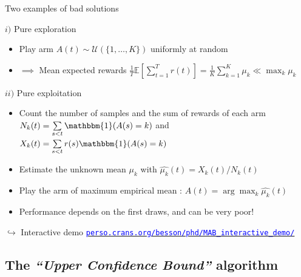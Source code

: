 \documentclass[11pt,english,ignorenonframetext,]{beamer}
\begin{document}
\begin{frame}{Two examples of bad solutions}

  \begin{exampleblock}{$i)$ Pure exploration}
    \begin{itemize}
      \item
      Play arm $A(t) \sim \mathcal{U}(\{1,\dots,K\})$ uniformly at random
      \item
      $\implies$ Mean expected rewards
      $ \frac{1}{T} \mathbb{E}\left[ \sum\limits_{t=1}^T r(t) \right] = \frac{1}{K} \sum\limits_{k=1}^K \mu_k \ll \max_k \mu_k$
    \end{itemize}
  \end{exampleblock}

  \pause

  \begin{exampleblock}{$ii)$ Pure exploitation}
    \begin{itemize}
      \item
        Count the number of samples and the sum of rewards of each arm $N_k(t) = \sum\limits_{s < t} \mathbbm{1}(A(s)=k)$ and $X_k(t) = \sum\limits_{s < t} r(s) \mathbbm{1}(A(s)=k)$
      \item
        Estimate the \alert{unknown} mean $\mu_k$ with $\widehat{\mu_k}(t) = X_k(t) / N_k(t)$
      \item
        Play the arm of maximum empirical mean : $A(t) = \arg\max_k \widehat{\mu_k}(t)$
      \item
        Performance depends on the first draws, and can be very poor!
    \end{itemize}
  \end{exampleblock}

  \begin{tiny}
    $\hookrightarrow$
    Interactive demo
    \href{https://perso.crans.org/besson/phd/MAB_interactive_demo/}{\textcolor{blue}{\texttt{perso.crans.org/besson/phd/MAB\_interactive\_demo/}}}
  \end{tiny}

\end{frame}


\subsection{\hfill{}The \emph{``Upper Confidence Bound''} algorithm\hfill{}}
\end{document}
